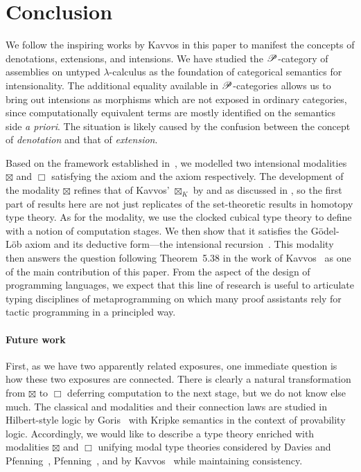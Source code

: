 \documentclass[a4paper,UKenglish,numberwithinsect,cleveref,thm-restate]{lipics-v2021}
\numberwithin{equation}{section}
\theoremstyle{plain}
\begin{document}
\begin{proposition}
\end{proposition}
\section{Conclusion}\label{sec:conclusion}

We follow the inspiring works by Kavvos in this paper to manifest the concepts of denotations, extensions, and intensions.
We have studied the $\mathscr{P}$-category of assemblies on untyped $\lambda$-calculus as the foundation of categorical semantics for intensionality. 
The additional equality available in $\mathscr{P}$-categories allows us to bring out intensions as morphisms which are not exposed in ordinary categories, since computationally equivalent terms are mostly identified on the semantics side \emph{a priori}.
The situation is likely caused by the confusion between the concept of \emph{denotation} and that of \emph{extension}.

Based on the framework established in~, we modelled two intensional modalities $\boxtimes$ and $\Box$ satisfying the \SFour axiom and the \GL axiom respectively.
The development of the \SFour modality $\boxtimes$ refines that of Kavvos' $\boxtimes_K$ by  and as discussed in , so the first part of results here are not just replicates of the set-theoretic results in homotopy type theory. 
As for the \GL modality, we use the clocked cubical type theory to define with a notion of computation stages.
We then show that it satisfies the Gödel-Löb axiom and its deductive form---the intensional recursion~\cite{Kavvos2017b}.
This \GL modality then answers the question following Theorem~5.38 in the work of Kavvos~\cite{Kavvos2020} as one of the main contribution of this paper.
From the aspect of the design of programming languages, we expect that this line of research is useful to articulate typing disciplines of metaprogramming on which many proof assistants rely for tactic programming in a principled way.

\paragraph*{Future work}
First, as we have two apparently related exposures, one immediate question is how these two exposures are connected.  There is clearly a natural transformation from $\boxtimes$ to $\Box$ deferring computation to the next stage, but we do not know else much.
The classical \SFour and \GL modalities and their connection laws are studied in Hilbert-style logic by Goris~\cite{Goris2009} with Kripke semantics in the context of provability logic.
Accordingly, we would like to describe a type theory enriched with modalities $\boxtimes$ and $\Box$ unifying modal type theories considered by Davies and Pfenning~\cite{Davies2001b}, Pfenning~\cite{Pfenning2002a}, and by Kavvos~\cite{Kavvos2017b,Kavvos2020} while maintaining consistency.
\end{document}
